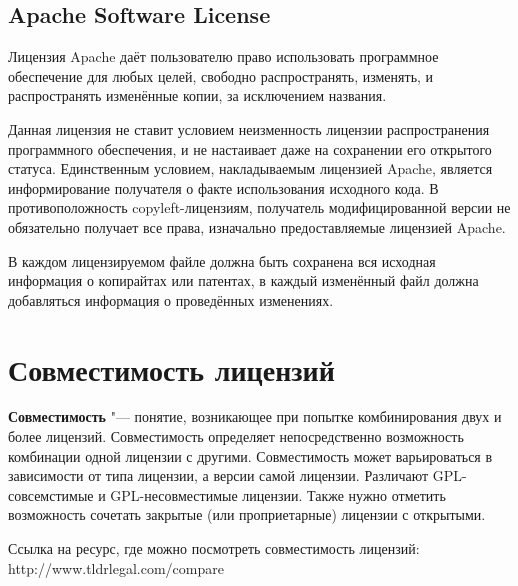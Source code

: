 \documentclass[10pt, a5paper]{article}
\begin{document}
\subsection*{Apache Software License}

Лицензия Apache даёт пользователю право использовать программное обеспечение для любых целей, свободно распространять, изменять, и распространять изменённые копии, за исключением названия.

Данная лицензия не ставит условием неизменность лицензии распространения программного обеспечения, и не настаивает даже на сохранении его открытого статуса. Единственным условием, накладываемым лицензией Apache, является информирование получателя о факте использования исходного кода. В противоположность copyleft-лицензиям, получатель модифицированной версии не обязательно получает все права, изначально предоставляемые лицензией Apache.

В каждом лицензируемом файле должна быть сохранена вся исходная информация о копирайтах или патентах, в каждый изменённый файл должна добавляться информация о проведённых изменениях.

\section*{Совместимость лицензий}

\textbf{Совместимость} "--- понятие, возникающее при попытке комбинирования двух и более лицензий. Совместимость определяет непосредственно возможность комбинации одной лицензии с другими. Совместимость может варьироваться в зависимости от типа лицензии, а версии самой лицензии. Различают GPL-совсемстимые и GPL-несовместимые лицензии. Также нужно отметить возможность сочетать закрытые (или проприетарные) лицензии с открытыми.

Ссылка на ресурс, где можно посмотреть совместимость лицензий: http://www.tldrlegal.com/compare

\end{document}
